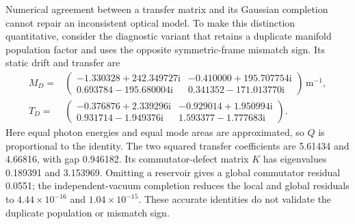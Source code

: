 \documentclass[11pt,a4paper]{article}
\newcommand{\ii}{\mathrm i}
\begin{document}
Numerical agreement between a transfer matrix and its Gaussian completion
cannot repair an inconsistent optical model. To make this distinction
quantitative, consider the diagnostic variant that retains a duplicate
manifold population factor and uses the opposite symmetric-frame mismatch
sign. Its static drift and transfer are
\begin{align}
 M_D={}&\begin{pmatrix}
 -1.330328+242.349727\ii&-0.410000+195.707754\ii\\
 0.693784-195.680004\ii&0.341352-171.013770\ii
 \end{pmatrix}\,\mathrm{m}^{-1},\label{eq:gc-countermodel-drift}\\
 T_D={}&\begin{pmatrix}
 -0.376876+2.339296\ii&-0.929014+1.950994\ii\\
 0.931714-1.949376\ii&1.593377-1.777683\ii
 \end{pmatrix}.
 \label{eq:gc-countermodel-transfer}
\end{align}
Here equal photon energies and equal mode areas are approximated, so $Q$
is proportional to the identity. The two squared transfer coefficients are
5.61434 and 4.66816, with gap 0.946182. Its commutator-defect matrix $K$
has eigenvalues 0.189391 and 3.153969. Omitting a reservoir gives a global
commutator residual 0.0551; the independent-vacuum completion reduces the
local and global residuals to $4.44\times10^{-16}$ and $1.04\times10^{-15}$.
These accurate identities do not validate the duplicate population or
mismatch sign.
\end{document}
